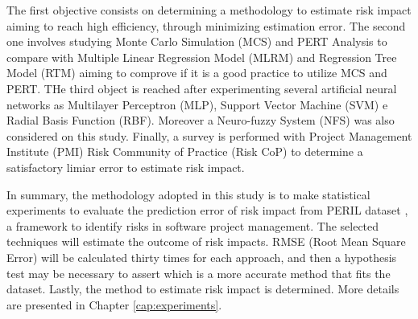 The first objective consists on determining a methodology to estimate risk impact aiming to reach high efficiency, through minimizing estimation error. The second one involves studying Monte Carlo Simulation (MCS) and PERT Analysis to compare with Multiple Linear Regression Model (MLRM) and Regression Tree Model (RTM) aiming to comprove if it is a good practice to utilize MCS and PERT. THe third object is reached after experimenting several artificial neural networks as Multilayer Perceptron (MLP), Support Vector Machine (SVM) e Radial Basis Function (RBF). Moreover a Neuro-fuzzy System (NFS) was also considered on this study. Finally, a survey is performed with Project Management Institute (PMI) Risk Community of Practice (Risk CoP) to determine a satisfactory limiar error to estimate risk impact.

In summary, the methodology adopted in this study is to make statistical experiments to evaluate the prediction error of risk impact from PERIL dataset \cite{kendrick2003identifying}, a framework to identify risks in software project management. The selected techniques will estimate the outcome of risk impacts. RMSE (Root Mean Square Error) will be calculated thirty times for each approach, and then a hypothesis test may be necessary to assert which is a more accurate method that fits the dataset. Lastly, the method to estimate risk impact is determined. More details are presented in Chapter \ref{cap:experiments}.


